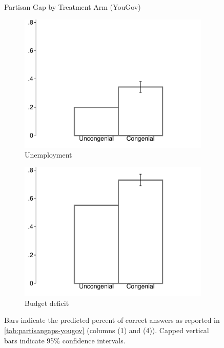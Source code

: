 \documentclass[12pt, letterpaper]{article}
\begin{document}
\begin{figure}[t]
	\caption{Partisan Gap by Treatment Arm (YouGov)}	
	\centering
	\begin{subfigure}{.495\textwidth}\centering
		\includegraphics[width=\textwidth]{../figs/yougov-unemp-congenialcue.pdf}
		\caption{Unemployment}
	\end{subfigure}
	\hfil
	\begin{subfigure}{.495\textwidth}\centering
		\includegraphics[width=\textwidth]{../figs/yougov-deficit-congenialcue.pdf}
		\caption{Budget deficit}
	\end{subfigure}	
	\caption*{\footnotesize Bars indicate the predicted percent of correct answers as reported in \cref{tab:partisangaps-yougov} (columns (1) and (4)).  
		Capped vertical bars indicate 95\% confidence intervals.
	}
	\label{fig:yougov-reg}
\end{figure}
\end{document}
